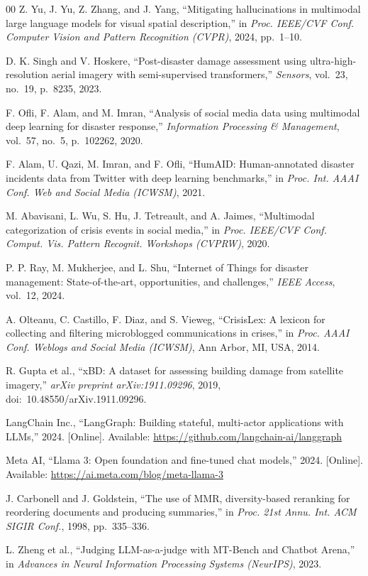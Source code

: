 \begin{thebibliography}{00}
 Z. Yu, J. Yu, Z. Zhang, and J. Yang,
``Mitigating hallucinations in multimodal large language models for visual
spatial description,''
in \textit{Proc. IEEE/CVF Conf. Computer Vision and Pattern Recognition
(CVPR)}, 2024, pp.~1--10.

 D. K. Singh and V. Hoskere,
``Post-disaster damage assessment using ultra-high-resolution aerial imagery
with semi-supervised transformers,''
\textit{Sensors}, vol.~23, no.~19, p.~8235, 2023.

 F. Ofli, F. Alam, and M. Imran,
``Analysis of social media data using multimodal deep learning for disaster
response,''
\textit{Information Processing \& Management}, vol.~57, no.~5, p.~102262,
2020.

 F. Alam, U. Qazi, M. Imran, and F. Ofli,
``HumAID: Human-annotated disaster incidents data from Twitter with deep
learning benchmarks,''
in \textit{Proc. Int. AAAI Conf. Web and Social Media (ICWSM)}, 2021.

 M. Abavisani, L. Wu, S. Hu, J. Tetreault, and A. Jaimes,
``Multimodal categorization of crisis events in social media,''
in \textit{Proc. IEEE/CVF Conf. Comput. Vis. Pattern Recognit. Workshops
(CVPRW)}, 2020.

 P. P. Ray, M. Mukherjee, and L. Shu,
``Internet of Things for disaster management: State-of-the-art, opportunities,
and challenges,'' \textit{IEEE Access}, vol.~12, 2024.

 A. Olteanu, C. Castillo, F. Diaz, and S. Vieweg,
``CrisisLex: A lexicon for collecting and filtering microblogged
communications in crises,''
in \textit{Proc. AAAI Conf. Weblogs and Social Media (ICWSM)},
Ann Arbor, MI, USA, 2014.

 R. Gupta et al.,
``xBD: A dataset for assessing building damage from satellite imagery,''
\textit{arXiv preprint arXiv:1911.09296}, 2019,
doi:~10.48550/arXiv.1911.09296.

 LangChain Inc., ``LangGraph: Building stateful, multi-actor
applications with LLMs,'' 2024. [Online]. Available:
\url{https://github.com/langchain-ai/langgraph}

 Meta AI, ``Llama 3: Open foundation and fine-tuned chat
models,'' 2024. [Online]. Available:
\url{https://ai.meta.com/blog/meta-llama-3}

 J. Carbonell and J. Goldstein,
``The use of MMR, diversity-based reranking for reordering documents and
producing summaries,''
in \textit{Proc. 21st Annu. Int. ACM SIGIR Conf.}, 1998, pp.~335--336.

 L. Zheng et al.,
``Judging LLM-as-a-judge with MT-Bench and Chatbot Arena,''
in \textit{Advances in Neural Information Processing Systems (NeurIPS)},
2023.

\end{thebibliography}


